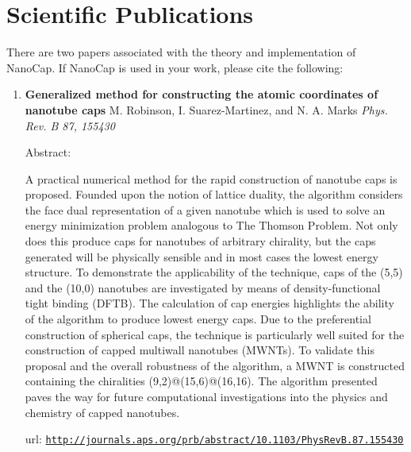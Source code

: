 %
%

\section{Scientific Publications}

There are two papers associated with the theory and implementation of NanoCap. If NanoCap is used in your work, please cite the following:

\begin{enumerate}
\item \textbf{Generalized method for constructing the atomic coordinates of nanotube caps}
\newline M. Robinson, I. Suarez-Martinez, and N. A. Marks \textit{Phys. Rev. B 87, 155430}

Abstract:

A practical numerical method for the rapid construction of nanotube caps is proposed. 
Founded upon the notion of lattice duality, the algorithm considers the face dual representation of a given nanotube which is used to solve an energy minimization problem analogous to The Thomson Problem. 
Not only does this produce caps for nanotubes of arbitrary chirality, but the caps generated will be physically sensible and in most cases the lowest energy structure. 
To demonstrate the applicability of the technique, caps of the (5,5) and the (10,0) nanotubes are investigated by means of density-functional tight binding (DFTB). 
The calculation of cap energies highlights the ability of the algorithm to produce lowest energy caps. 
Due to the preferential construction of spherical caps, the technique is particularly well suited for the construction of capped multiwall nanotubes (MWNTs). To validate this proposal and the overall robustness of the algorithm, a MWNT is constructed containing the chiralities (9,2)@(15,6)@(16,16). 
The algorithm presented paves the way for future computational investigations into the physics and chemistry of capped nanotubes.


url: \href{http://journals.aps.org/prb/abstract/10.1103/PhysRevB.87.155430}{\texttt{http://journals.aps.org/prb/abstract/10.1103/PhysRevB.87.155430}}


\end{enumerate}
